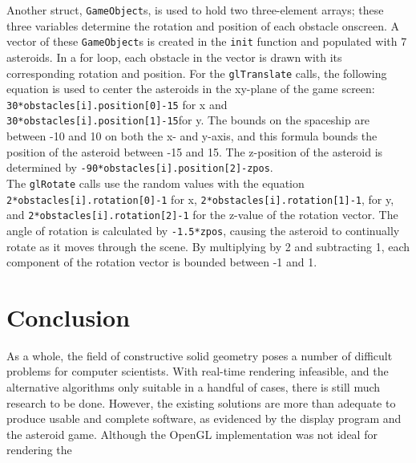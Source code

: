 \documentclass[12pt]{article}
\begin{document}
\begin{doublespace}
Another struct, \texttt{GameObject}s, is used to hold two three-element arrays; these three variables determine the rotation and position of each obstacle onscreen. A vector of these \texttt{GameObject}s is created in the \texttt{init} function and populated with 7 asteroids. In a for loop, each obstacle in the vector is drawn with its corresponding rotation and position. For the \texttt{glTranslate} calls, the following equation is used to center the asteroids in the xy-plane of the game screen: \texttt{30*obstacles[i].position[0]-15} for x and \texttt{30*obstacles[i].position[1]-15}for y. The bounds on the spaceship are between -10 and 10 on both the x- and y-axis, and this formula bounds the position of the asteroid between -15 and 15. The z-position of the asteroid is determined by \texttt{-90*obstacles[i].position[2]-zpos}.\\

The \texttt{glRotate} calls use the random values with the equation \texttt{2*obstacles[i].rotation[0]-1} for x, \texttt{2*obstacles[i].rotation[1]-1}, for y, and \texttt{2*obstacles[i].rotation[2]-1} for the z-value of the rotation vector. The angle of rotation is calculated by \texttt{-1.5*zpos}, causing the asteroid to continually rotate as it moves through the scene. By multiplying by 2 and subtracting 1, each component of the rotation vector is bounded between -1 and 1.
\section{Conclusion}
As a whole, the field of constructive solid geometry poses a number of difficult problems for computer scientists. With real-time rendering infeasible, and the alternative algorithms only suitable in a handful of cases, there is still much research to be done. However, the existing solutions are more than adequate to produce usable and complete software, as evidenced by the display program and the asteroid game. Although the OpenGL implementation was not ideal for rendering the 
\newpage
\end{doublespace}
\end{document}
